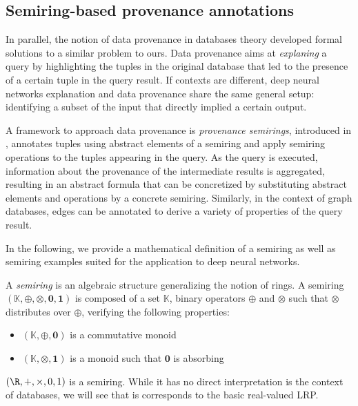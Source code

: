 \documentclass{../cs-classes/cs-classes}
\begin{document}

\subsection{Semiring-based provenance annotations}
In parallel, the notion of data provenance in databases theory developed formal solutions to a similar problem to ours. Data provenance aims at \emph{explaning} a query by highlighting the tuples in the original database that led to the presence of a certain tuple in the query result. If contexts are different, deep neural networks explanation and data provenance share the same general setup: identifying a subset of the input that directly implied a certain output.

A framework to approach data provenance is \emph{provenance semirings}, introduced in \cite{green-2007}, annotates tuples using abstract elements of a semiring and apply semiring operations to the tuples appearing in the query. As the query is executed, information about the provenance of the intermediate results is aggregated, resulting in an abstract formula that can be concretized by substituting abstract elements and operations by a concrete semiring. Similarly, in the context of graph databases, edges can be annotated to derive a variety of properties of the query result. \cite{ramusat-prov}

In the following, we provide a mathematical definition of a semiring as well as semiring examples suited for the application to deep neural networks.

\begin{definition}[Semiring]
    A \emph{semiring} is an algebraic structure generalizing the notion of rings. A semiring $(\mathbb{K}, \oplus, \otimes, \mathbf{0}, \mathbf{1})$ is composed of a set $\mathbb{K}$, binary operators $\oplus$ and $\otimes$ such that $\otimes$ distributes over $\oplus$, verifying the following properties:
    \begin{itemize}
        \item $(\mathbb{K}, \oplus, \mathbf{0})$ is a commutative monoid
        \item $(\mathbb{K}, \otimes, \mathbf{1})$ is a monoid such that $\mathbf{0}$ is absorbing
    \end{itemize}
\end{definition}

\begin{example}
    $(\R, +, \times, 0, 1)$ is a semiring. While it has no direct interpretation is the context of databases, we will see that is corresponds to the basic real-valued LRP.
\end{example}
\end{document}
